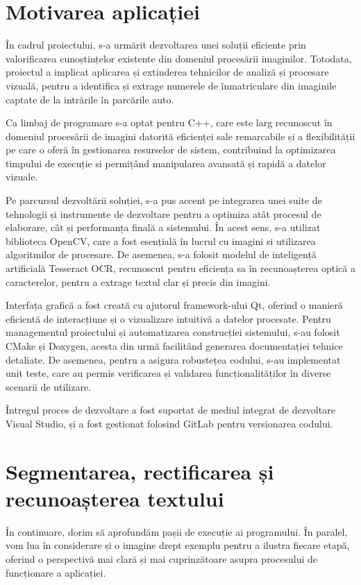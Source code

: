 \documentclass[a4paper,12pt]{report}
\begin{document}
\section*{Motivarea aplicației}
În cadrul proiectului, s-a urmărit dezvoltarea unei soluții eficiente prin valorificarea cunoștințelor existente din domeniul procesării imaginilor. Totodata, proiectul a implicat aplicarea și extinderea tehnicilor de analiză și procesare vizuală, pentru a identifica și extrage numerele de înmatriculare din imaginile captate de la intrările în parcările auto.

Ca limbaj de programare s-a optat pentru C++, care este larg recunoscut în domeniul procesării de imagini datorită eficienței sale remarcabile și a flexibilității pe care o oferă în gestionarea resurselor de sistem, contribuind la optimizarea timpului de execuție si permițând manipularea avansată și rapidă a datelor vizuale.

Pe parcursul dezvoltării soluției, s-a pus accent pe integrarea unei suite de tehnologii și instrumente de dezvoltare pentru a optimiza atât procesul de elaborare, cât și performanța finală a sistemului. În acest sens, s-a utilizat biblioteca OpenCV, care a fost esențială în lucrul cu imagini si utilizarea algoritmilor de procesare. De asemenea, s-a folosit modelul de inteligență artificială Tesseract OCR, recunoscut pentru eficiența sa în recunoașterea optică a caracterelor, pentru a extrage textul clar și precis din imagini.

Interfața grafică a fost creată cu ajutorul framework-ului Qt, oferind o manieră eficientă de interacțiune și o vizualizare intuitivă a datelor procesate. Pentru managementul proiectului și automatizarea construcției sistemului, s-au folosit CMake și Doxygen, acesta din urmă facilitând generarea documentației tehnice detaliate. De asemenea, pentru a asigura robustețea codului, s-au implementat unit teste, care au permis verificarea și validarea funcționalităților în diverse scenarii de utilizare.

Întregul proces de dezvoltare a fost suportat de mediul integrat de dezvoltare Visual Studio, și a fost gestionat folosind GitLab pentru versionarea codului.

\section*{Segmentarea, rectificarea și recunoașterea textului}
În continuare, dorim să aprofundăm pașii de execuție ai programului. În paralel, vom lua în considerare și o imagine drept exemplu pentru a ilustra fiecare etapă, oferind o perspectivă mai clară și mai cuprinzătoare asupra procesului de funcționare a aplicației.
\end{document}
